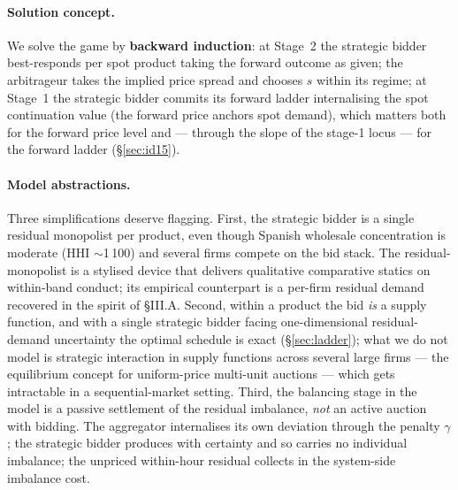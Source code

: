 \documentclass[11pt,a4paper]{article}
\theoremstyle{definition}
\theoremstyle{remark}
\theoremstyle{plain}
\begin{document}
\paragraph{Solution concept.} We solve the game by \textbf{backward induction}: at Stage~2 the strategic bidder best-responds per spot product taking the forward outcome as given; the arbitrageur takes the implied price spread and chooses $s$ within its regime; at Stage~1 the strategic bidder commits its forward ladder internalising the spot continuation value (the forward price anchors spot demand), which matters both for the forward price level and --- through the slope of the stage-1 locus --- for the forward ladder (\S\ref{sec:id15}).

\paragraph{Model abstractions.} Three simplifications deserve flagging. First, the strategic bidder is a single residual monopolist per product, even though Spanish wholesale concentration is moderate (HHI $\sim$1\,100) and several firms compete on the bid stack. The residual-monopolist is a stylised device that delivers qualitative comparative statics on within-band conduct; its empirical counterpart is a per-firm residual demand recovered in the spirit of \citet{ito_reguant_2016} \S III.A. Second, within a product the bid \emph{is} a supply function, and with a single strategic bidder facing one-dimensional residual-demand uncertainty the optimal schedule is exact (\S\ref{sec:ladder}); what we do not model is strategic interaction in supply functions across several large firms --- the \citet{klemperer_meyer_1989} equilibrium concept for uniform-price multi-unit auctions --- which gets intractable in a sequential-market setting. Third, the balancing stage in the model is a passive settlement of the residual imbalance, \emph{not} an active auction with bidding. The aggregator internalises its own deviation through the penalty $\gamma$; the strategic bidder produces with certainty and so carries no individual imbalance; the unpriced within-hour residual collects in the system-side imbalance cost.
\end{document}
